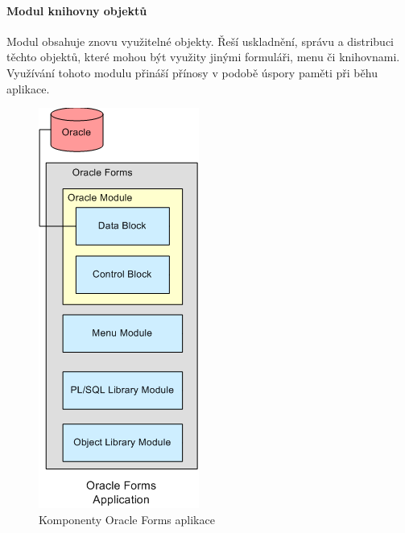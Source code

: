 \documentclass{diplomka}
\begin{document}
\paragraph{Modul knihovny objektů}
Modul obsahuje znovu využitelné objekty. Řeší uskladnění, správu a distribuci těchto objektů, které mohou být využity jinými formuláři, menu či knihovnami. Využívání tohoto modulu přináší přínosy v podobě úspory paměti při běhu aplikace.

\begin{figure}[H]
  \centering
  \includegraphics[scale=0.8]{obr/forms_arch3.png}
\caption{Komponenty Oracle Forms aplikace\cite{microsoft}}
\label{fig:arch3}
\end{figure}
\newpage
\end{document}
